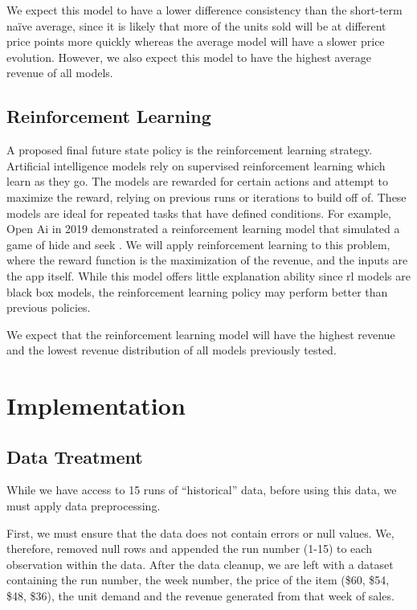 \documentclass[11pt,a4paper]{article}
\begin{document}
We expect this model to have a lower difference consistency than the short-term naïve average, since it is likely that more of the units sold will be at different price points more quickly whereas the average model will have a slower price evolution. 
However, we also expect this model to have the highest average revenue of all models.

\subsection{Reinforcement Learning}
A proposed final future state policy is the reinforcement learning strategy. 
Artificial intelligence models rely on supervised reinforcement learning which learn as they go. 
The models are rewarded for certain actions and attempt to maximize the reward, relying on previous runs or iterations to build off of. 
These models are ideal for repeated tasks that have defined conditions. For example, Open Ai in 2019 demonstrated a reinforcement learning model that simulated a game of hide and seek \cite{baker2019emergent}. 
We will apply reinforcement learning to this problem, where the reward function is the maximization of the revenue, and the inputs are the app itself. 
While this model offers little explanation ability since rl models are black box models, the reinforcement learning policy may perform better than previous policies.

We expect that the reinforcement learning model will have the highest revenue and the lowest revenue distribution of all models previously tested.

\section{Implementation}

\subsection{Data Treatment}
While we have access to 15 runs of “historical” data, before using this data, we must apply data preprocessing.
\pagebreak

First, we must ensure that the data does not contain errors or null values. 
We, therefore, removed null rows and appended the run number (1-15) to each observation within the data. 
After the data cleanup, we are left with a dataset containing the run number, the week number, the price of the item (\$60, \$54, \$48, \$36), the unit demand and the revenue generated from that week of sales.
\end{document}
